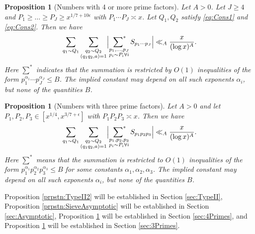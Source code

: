 \documentclass[10pt]{amsart}
\theoremstyle{plain}
\newtheorem{prpstn}[thrm]{Proposition}
\numberwithin{equation}{section}
\begin{document}
%
%
%
%
%
%
%
%
\begin{prpstn}[Numbers with 4 or more prime factors]\label{prpstn:4Primes}
Let $A>0$. Let $J\ge 4$ and $P_1\ge\dots\ge P_J\ge x^{1/7+10\epsilon}$ with $P_1\cdots P_J\asymp x$. Let $Q_1,Q_2$ satisfy \eqref{eq:Cons1} and \eqref{eq:Cons2}. Then we have
\[
\sum_{q_1\sim Q_1}\sum_{\substack{q_2\sim Q_2\\ (q_1q_2,a)=1}}\Bigl|\mathop{\sideset{}{^*}\sum}_{\substack{p_1,\dots,p_J\\ p_i\sim P_i\forall i}}S_{p_1\cdots p_J}\Bigr|\ll_{A}\frac{x}{(\log{x})^A}.
\]
Here $\sum^*$ indicates that the summation is restricted by $O(1)$ inequalities of the form $p_1^{\alpha_1} \cdots p_J^{\alpha_J}\le B$. The implied constant may depend on all such exponents $\alpha_i$, but none of the quantities $B$.
\end{prpstn}
%
%
%
%
%
%
%
%
\begin{prpstn}[Numbers with three prime factors]\label{prpstn:3Primes}
Let $A>0$ and let $P_1,P_2,P_3\in [x^{1/4},x^{3/7+\epsilon}]$ with $P_1P_2P_3\asymp x$. Then we have
\[
\sum_{q_1\sim Q_1}\sum_{\substack{q_2\sim Q_2\\ (q_1q_2,a)=1}}\Bigl|\mathop{\sideset{}{^*}\sum}_{\substack{p_1,p_2,p_3\\ p_i\sim P_i\forall i}}S_{p_1p_2p_3}\Bigr|\ll_A \frac{x}{(\log{x})^A}.
\]
Here $\sum^*$ means that the summation is restricted to $O(1)$ inequalities of the form $p_1^{\alpha_1}p_2^{\alpha_2} p_3^{\alpha_3}\le B$ for some constants $\alpha_1,\alpha_2, \alpha_3$. The implied constant may depend on all such exponents $\alpha_i$, but none of the quantities $B$.
\end{prpstn}
%
%
%
%
%
%
%
%
Proposition \ref{prpstn:TypeII2} will be established in Section \ref{sec:TypeII}, Proposition \ref{prpstn:SieveAsymptotic} will be established in Section \ref{sec:Asymptotic}, Proposition \ref{prpstn:4Primes} will be established in Section \ref{sec:4Primes}, and Proposition \ref{prpstn:3Primes} will be established in Section \ref{sec:3Primes}. 
\end{document}
